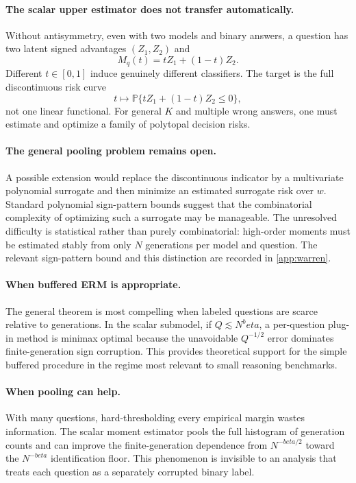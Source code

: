 \documentclass[11pt]{article}
\def\beta{beta}%
\newcommand{\Pp}{\mathbb P}
\begin{document}
\paragraph{The scalar upper estimator does not transfer automatically.}
Without antisymmetry, even with two models and binary answers, a question has two latent signed advantages $(Z_1,Z_2)$ and
\[
M_q(t)=tZ_1+(1-t)Z_2.
\]
Different $t\in[0,1]$ induce genuinely different classifiers.  The target is the full discontinuous risk curve
\[
t\mapsto \Pp\{tZ_1+(1-t)Z_2\le0\},
\]
not one linear functional.  For general $K$ and multiple wrong answers, one must estimate and optimize a family of polytopal decision risks.

\paragraph{The general pooling problem remains open.}
A possible extension would replace the discontinuous indicator by a multivariate polynomial surrogate and then minimize an estimated surrogate risk over $w$.  Standard polynomial sign-pattern bounds suggest that the combinatorial complexity of optimizing such a surrogate may be manageable.  The unresolved difficulty is statistical rather than purely combinatorial: high-order moments must be estimated stably from only $N$ generations per model and question.  The relevant sign-pattern bound and this distinction are recorded in \cref{app:warren}.

\paragraph{When buffered ERM is appropriate.}
The general theorem is most compelling when labeled questions are scarce relative to generations.  In the scalar submodel, if $Q\lesssim N^\beta$, a per-question plug-in method is minimax optimal because the unavoidable $Q^{-1/2}$ error dominates finite-generation sign corruption.  This provides theoretical support for the simple buffered procedure in the regime most relevant to small reasoning benchmarks.

\paragraph{When pooling can help.}
With many questions, hard-thresholding every empirical margin wastes information.  The scalar moment estimator pools the full histogram of generation counts and can improve the finite-generation dependence from $N^{-\beta/2}$ toward the $N^{-\beta}$ identification floor.  This phenomenon is invisible to an analysis that treats each question as a separately corrupted binary label.
\end{document}
